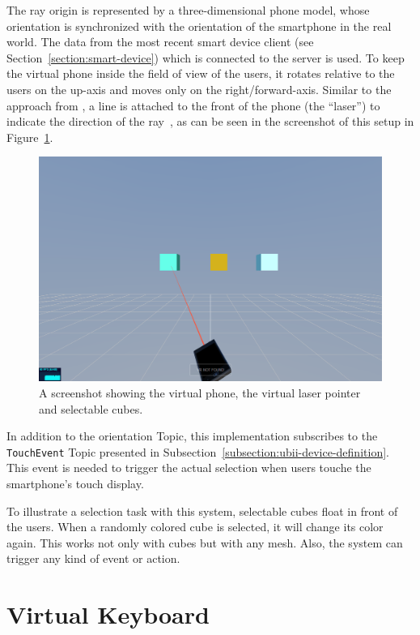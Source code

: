The ray origin is represented by a three-dimensional phone model, whose orientation is synchronized with the orientation of the smartphone in the real world. The data from the most recent smart device client (see Section~\ref{section:smart-device}) which is connected to the server is used. To keep the virtual phone inside the field of view of the users, it rotates relative to the users on the up-axis and moves only on the right/forward-axis.
Similar to the approach from \citeauthor{Steed.2013}, a line is attached to the front of the phone (the \enquote{laser}) to indicate the direction of the ray~\cite[46]{Steed.2013}, as can be seen in the screenshot of this setup in Figure~\ref{fig:screenshot-exp-lp}.

\begin{figure}[H]
	\centering
	\includegraphics[width=12cm]{figures/implementation/screenshot_exp_lp.png}
	\caption[Screenshot of the laser pointer]{A screenshot showing the virtual phone, the virtual laser pointer and selectable cubes.}\label{fig:screenshot-exp-lp}
\end{figure}

In addition to the orientation Topic, this implementation subscribes to the \lstinline{TouchEvent} Topic presented in Subsection~\ref{subsection:ubii-device-definition}. This event is needed to trigger the actual selection when users touche the smartphone's touch display.

To illustrate a selection task with this system, selectable cubes float in front of the users. 
When a randomly colored cube is selected, it will change its color again. This works not only with cubes but with any mesh. Also, the system can trigger any kind of event or action.


\section{Virtual Keyboard}\label{section:virtual-keyboard}

